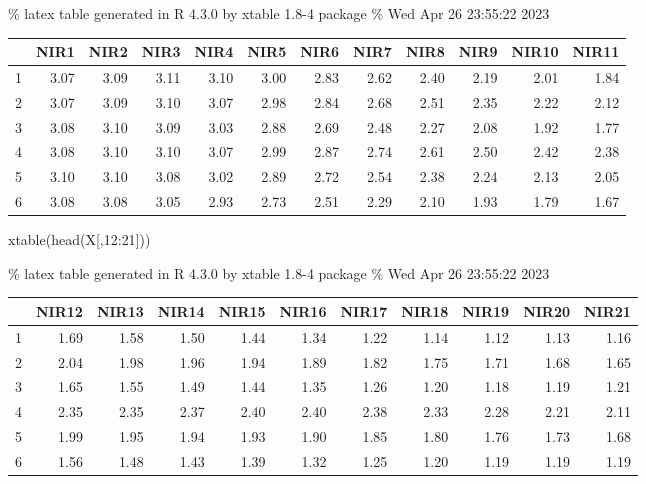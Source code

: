 \documentclass[
]{article}
\newenvironment{Shaded}{\begin{snugshade}}{\end{snugshade}}
\newcommand{\DecValTok}[1]{\textcolor[rgb]{0.00,0.00,0.81}{#1}}
\newcommand{\FunctionTok}[1]{\textcolor[rgb]{0.00,0.00,0.00}{#1}}
\newcommand{\NormalTok}[1]{#1}
\newcommand{\SpecialCharTok}[1]{\textcolor[rgb]{0.00,0.00,0.00}{#1}}
\begin{document}
\% latex table generated in R 4.3.0 by xtable 1.8-4 package \% Wed Apr
26 23:55:22 2023

\begin{table}[ht]
\centering
\begin{tabular}{rrrrrrrrrrrr}
  \hline
 & NIR1 & NIR2 & NIR3 & NIR4 & NIR5 & NIR6 & NIR7 & NIR8 & NIR9 & NIR10 & NIR11 \\ 
  \hline
1 & 3.07 & 3.09 & 3.11 & 3.10 & 3.00 & 2.83 & 2.62 & 2.40 & 2.19 & 2.01 & 1.84 \\ 
  2 & 3.07 & 3.09 & 3.10 & 3.07 & 2.98 & 2.84 & 2.68 & 2.51 & 2.35 & 2.22 & 2.12 \\ 
  3 & 3.08 & 3.10 & 3.09 & 3.03 & 2.88 & 2.69 & 2.48 & 2.27 & 2.08 & 1.92 & 1.77 \\ 
  4 & 3.08 & 3.10 & 3.10 & 3.07 & 2.99 & 2.87 & 2.74 & 2.61 & 2.50 & 2.42 & 2.38 \\ 
  5 & 3.10 & 3.10 & 3.08 & 3.02 & 2.89 & 2.72 & 2.54 & 2.38 & 2.24 & 2.13 & 2.05 \\ 
  6 & 3.08 & 3.08 & 3.05 & 2.93 & 2.73 & 2.51 & 2.29 & 2.10 & 1.93 & 1.79 & 1.67 \\ 
   \hline
\end{tabular}
\end{table}

\begin{Shaded}
\begin{Highlighting}[]
\FunctionTok{xtable}\NormalTok{(}\FunctionTok{head}\NormalTok{(X[,}\DecValTok{12}\SpecialCharTok{:}\DecValTok{21}\NormalTok{]))}
\end{Highlighting}
\end{Shaded}

\% latex table generated in R 4.3.0 by xtable 1.8-4 package \% Wed Apr
26 23:55:22 2023

\begin{table}[ht]
\centering
\begin{tabular}{rrrrrrrrrrr}
  \hline
 & NIR12 & NIR13 & NIR14 & NIR15 & NIR16 & NIR17 & NIR18 & NIR19 & NIR20 & NIR21 \\ 
  \hline
1 & 1.69 & 1.58 & 1.50 & 1.44 & 1.34 & 1.22 & 1.14 & 1.12 & 1.13 & 1.16 \\ 
  2 & 2.04 & 1.98 & 1.96 & 1.94 & 1.89 & 1.82 & 1.75 & 1.71 & 1.68 & 1.65 \\ 
  3 & 1.65 & 1.55 & 1.49 & 1.44 & 1.35 & 1.26 & 1.20 & 1.18 & 1.19 & 1.21 \\ 
  4 & 2.35 & 2.35 & 2.37 & 2.40 & 2.40 & 2.38 & 2.33 & 2.28 & 2.21 & 2.11 \\ 
  5 & 1.99 & 1.95 & 1.94 & 1.93 & 1.90 & 1.85 & 1.80 & 1.76 & 1.73 & 1.68 \\ 
  6 & 1.56 & 1.48 & 1.43 & 1.39 & 1.32 & 1.25 & 1.20 & 1.19 & 1.19 & 1.19 \\ 
   \hline
\end{tabular}
\end{table}
\end{document}
